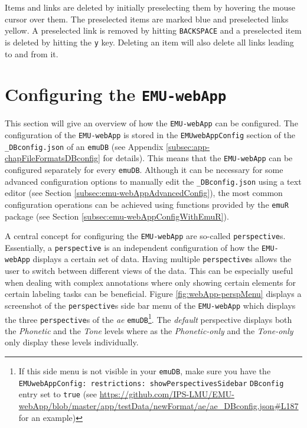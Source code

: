 \documentclass[
]{book}
\begin{document}
Items and links are deleted by initially preselecting them by hovering the mouse cursor over them. The preselected items are marked blue and preselected links yellow. A preselected link is removed by hitting \texttt{BACKSPACE} and a preselected item is deleted by hitting the \texttt{y} key. Deleting an item will also delete all links leading to and from it.

\hypertarget{configuring-the-emu-webapp}{%
\section{\texorpdfstring{Configuring the \texttt{EMU-webApp}}{Configuring the EMU-webApp}}\label{configuring-the-emu-webapp}}

This section will give an overview of how the \texttt{EMU-webApp} can be configured. The configuration of the \texttt{EMU-webApp} is stored in the \texttt{EMUwebAppConfig} section of the \texttt{\_DBconfig.json} of an \texttt{emuDB} (see Appendix \ref{subsec:app-chapFileFormatsDBconfig} for details). This means that the \texttt{EMU-webApp} can be configured separately for every \texttt{emuDB}. Although it can be necessary for some advanced configuration options to manually edit the \texttt{\_DBconfig.json} using a text editor (see Section \ref{subsec:emu-webAppAdvancedConfig}), the most common configuration operations can be achieved using functions provided by the \texttt{emuR} package (see Section \ref{subsec:emu-webAppConfigWithEmuR}).

A central concept for configuring the \texttt{EMU-webApp} are so-called \texttt{perspective}s. Essentially, a \texttt{perspective} is an independent configuration of how the \texttt{EMU-webApp} displays a certain set of data. Having multiple \texttt{perspective}s allows the user to switch between different views of the data. This can be especially useful when dealing with complex annotations where only showing certain elements for certain labeling tasks can be beneficial. Figure \ref{fig:webApp-perspMenu} displays a screenshot of the \texttt{perspective}s side bar menu of the \texttt{EMU-webApp} which displays the three \texttt{perspective}s of the \emph{ae} \texttt{emuDB}\footnote{If this side menu is not visible in your \texttt{emuDB}, make sure you have the \texttt{EMUwebAppConfig:\ restrictions:\ showPerspectivesSidebar} \texttt{DBconfig} entry set to \texttt{true} (see \url{https://github.com/IPS-LMU/EMU-webApp/blob/master/app/testData/newFormat/ae/ae_DBconfig.json\#L187} for an example)}. The \emph{default} perspective displays both the \emph{Phonetic} and the \emph{Tone} levels where as the \emph{Phonetic-only} and the \emph{Tone-only} only display these levels individually.
\end{document}
